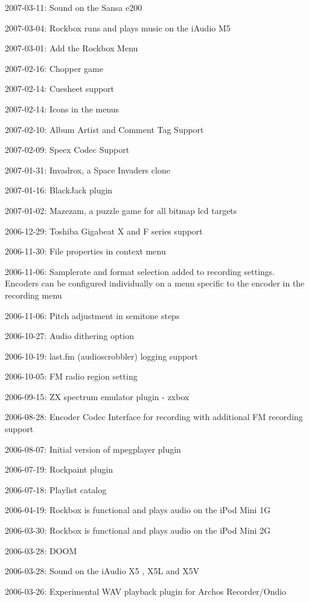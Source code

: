 \begin{changelog}
\item 2007-03-11: Sound on the Sansa e200
\item 2007-03-04: Rockbox runs and plays music on the iAudio M5
\item 2007-03-01: Add the Rockbox Menu
\item 2007-02-16: Chopper game
\item 2007-02-14: Cuesheet support
\item 2007-02-14: Icons in the menus
\item 2007-02-10: Album Artist and Comment Tag Support
\item 2007-02-09: Speex Codec Support
\item 2007-01-31: Invadrox, a Space Invaders clone
\item 2007-01-16: BlackJack plugin
\item 2007-01-02: Mazezam, a puzzle game for all bitmap lcd targets
\item 2006-12-29: Toshiba Gigabeat X and F series support
\item 2006-11-30: File properties in context menu
\item 2006-11-06: Samplerate and format selection added to recording
  settings. Encoders can be configured individually on a menu specific
  to the encoder in the recording menu
\item 2006-11-06: Pitch adjustment in semitone steps
\item 2006-10-27: Audio dithering option
\item 2006-10-19: last.fm (audioscrobbler) logging support
\item 2006-10-05: FM radio region setting
\item 2006-09-15: ZX spectrum emulator plugin - zxbox
\item 2006-08-28: Encoder Codec Interface for recording with
  additional FM recording support
\item 2006-08-07: Initial version of mpegplayer plugin
\item 2006-07-19: Rockpaint plugin
\item 2006-07-18: Playlist catalog
\item 2006-04-19: Rockbox is functional and plays audio on the iPod Mini 1G
\item 2006-03-30: Rockbox is functional and plays audio on the iPod Mini 2G
\item 2006-03-28: DOOM
\item 2006-03-28: Sound on the iAudio X5 , X5L and X5V
\item 2006-03-26: Experimental WAV playback plugin for Archos Recorder/Ondio

\end{changelog}
